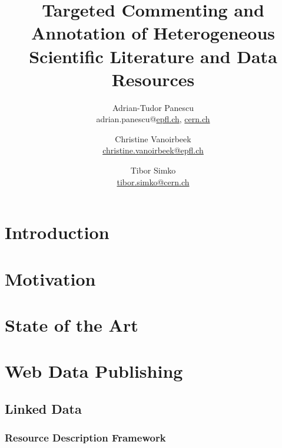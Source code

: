 \documentclass[12pt,a4paper,twoside]{report}
\author{
    Adrian-Tudor Panescu \\
    adrian.panescu@\href{mailto:adrian.panescu@epfl.ch}{epfl.ch},
                   \href{mailto:adrian.panescu@cern.ch}{cern.ch}
  \and
    Christine Vanoirbeek \\
    \href{mailto:christine.vanoirbeek@epfl.ch}{christine.vanoirbeek@epfl.ch}
  \and
    Tibor Simko \\
    \href{mailto:tibor.simko@cern.ch}{tibor.simko@cern.ch}
}
\title{Targeted Commenting and Annotation of Heterogeneous Scientific Literature
       and Data Resources}
\date{}  %
\begin{document}
  

  

  \setcounter{page}{3}

  \begin{abstract}
    
  \end{abstract}

  \cleardoublepage

  \tableofcontents
  \listoffigures

  \cleardoublepage

  \section{Introduction}
    \label{sec:intro}
    

  \clearpage

  \section{Motivation}
    \label{sec:motiv}
    

  \clearpage

  \section{State of the Art}
    \label{sec:soa}
    

  \clearpage

  \section{Web Data Publishing}
    \label{sec:wdp}
    

    \subsection{Linked Data}
      \label{sec:ld}
      

      \subsubsection{Resource Description Framework}
        \label{sec:rdf}
        
\end{document}
